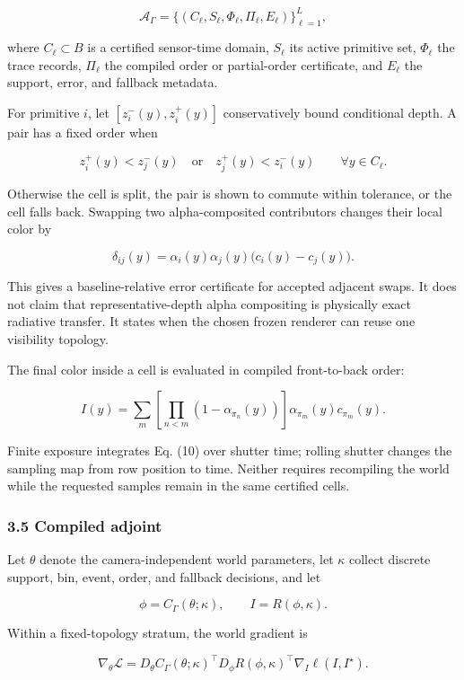 \documentclass[
]{article}
\begin{document}
\[
  \mathcal A_\Gamma=
  \{(C_\ell,S_\ell,\Phi_\ell,\Pi_\ell,E_\ell)\}_{\ell=1}^{L},
  \tag{7}
\]

where \(C_\ell\subset B\) is a certified sensor-time domain, \(S_\ell\)
its active primitive set, \(\Phi_\ell\) the trace records, \(\Pi_\ell\)
the compiled order or partial-order certificate, and \(E_\ell\) the
support, error, and fallback metadata.

For primitive \(i\), let \([z_i^-(y),z_i^+(y)]\) conservatively bound
conditional depth. A pair has a fixed order when

\[
  z_i^+(y)<z_j^-(y)
  \quad\text{or}\quad
  z_j^+(y)<z_i^-(y)
  \qquad\forall y\in C_\ell.
  \tag{8}
\]

Otherwise the cell is split, the pair is shown to commute within
tolerance, or the cell falls back. Swapping two alpha-composited
contributors changes their local color by

\[
  \delta_{ij}(y)
  =\alpha_i(y)\alpha_j(y)\bigl(c_i(y)-c_j(y)\bigr).
  \tag{9}
\]

This gives a baseline-relative error certificate for accepted adjacent
swaps. It does not claim that representative-depth alpha compositing is
physically exact radiative transfer. It states when the chosen frozen
renderer can reuse one visibility topology.

The final color inside a cell is evaluated in compiled front-to-back
order:

\[
  I(y)=\sum_m
  \left[\prod_{n<m}(1-\alpha_{\pi_n}(y))\right]
  \alpha_{\pi_m}(y)c_{\pi_m}(y).
  \tag{10}
\]

Finite exposure integrates Eq. (10) over shutter time; rolling shutter
changes the sampling map from row position to time. Neither requires
recompiling the world while the requested samples remain in the same
certified cells.

\subsubsection{3.5 Compiled adjoint}\label{compiled-adjoint}

Let \(\theta\) denote the camera-independent world parameters, let
\(\kappa\) collect discrete support, bin, event, order, and fallback
decisions, and let

\[
  \phi=C_\Gamma(\theta;\kappa),\qquad
  I=R(\phi,\kappa).
\]

Within a fixed-topology stratum, the world gradient is

\[
  \nabla_\theta\mathcal L
  =D_\theta C_\Gamma(\theta;\kappa)^\top
   D_\phi R(\phi,\kappa)^\top
   \nabla_I\ell(I,I^\star).
  \tag{11}
\]
\end{document}
